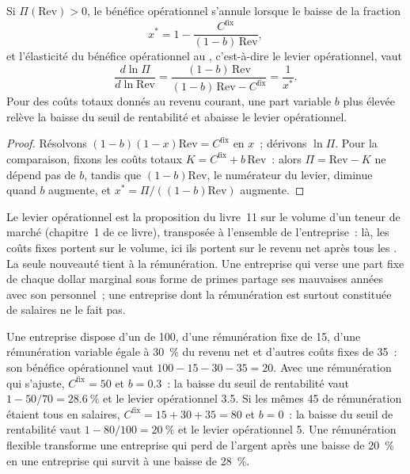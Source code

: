 \begin{proposition}\label{prop:fm:the-economics-of-a-trading-firm:fall}
Si $\Pi(\mathrm{Rev})>0$, le bénéfice opérationnel s'annule lorsque le  baisse de la fraction
\[
x^\ast=1-\frac{C^{\mathrm{fix}}}{(1-b)\,\mathrm{Rev}},
\]
et l'élasticité du bénéfice opérationnel au , c'est-à-dire le levier opérationnel, vaut
\[
\frac{d\ln\Pi}{d\ln\mathrm{Rev}}=\frac{(1-b)\,\mathrm{Rev}}{(1-b)\,\mathrm{Rev}-C^{\mathrm{fix}}}=\frac1{x^\ast}.
\]
Pour des coûts totaux donnés au revenu courant, une part variable $b$ plus élevée relève la baisse du seuil de rentabilité et abaisse le levier opérationnel.
\end{proposition}

\begin{proof}
Résolvons $(1-b)(1-x)\mathrm{Rev}=C^{\mathrm{fix}}$ en $x$~; dérivons $\ln\Pi$. Pour la comparaison, fixons les coûts totaux
$K=C^{\mathrm{fix}}+b\,\mathrm{Rev}$~: alors $\Pi=\mathrm{Rev}-K$ ne dépend pas de $b$, tandis que $(1-b)\mathrm{Rev}$, le numérateur du
levier, diminue quand $b$ augmente, et $x^\ast=\Pi/((1-b)\mathrm{Rev})$ augmente.
\end{proof}

Le levier opérationnel est la proposition du livre~11 sur le volume d'un teneur de marché (chapitre~1 de ce livre), transposée à l'ensemble de l'entreprise~: là, les coûts fixes portent
sur le volume, ici ils portent sur le revenu net après tous les . La seule nouveauté tient à la rémunération. Une entreprise qui verse une part fixe de chaque
dollar marginal sous forme de primes partage ses mauvaises années avec son personnel~; une entreprise dont la rémunération est surtout constituée de salaires ne le fait pas.

\begin{example}\label{ex:fm:the-economics-of-a-trading-firm:small}
Une entreprise dispose d'un  de 100, d'une rémunération fixe de 15, d'une rémunération variable égale à 30~\% du revenu net et d'autres coûts fixes de 35~: son bénéfice opérationnel vaut
$100-15-30-35=20$. Avec une rémunération qui s'ajuste, $C^{\mathrm{fix}}=50$ et $b=0.3$~: la baisse du seuil de rentabilité vaut $1-50/70=28.6~\%$ et le levier opérationnel 3.5.
Si les mêmes 45 de rémunération étaient tous en salaires, $C^{\mathrm{fix}}=15+30+35=80$ et $b=0$~: la baisse du seuil de rentabilité vaut $1-80/100=20~\%$ et le
levier opérationnel 5. Une rémunération flexible transforme une entreprise qui
perd de l'argent après une baisse de 20~\% en une entreprise qui survit à une baisse de 28~\%.
\end{example}

